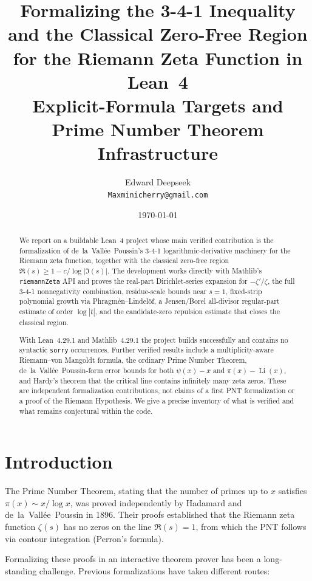 \documentclass[11pt,a4paper]{article}
\title{\bfseries Formalizing the 3-4-1 Inequality and the Classical Zero-Free Region\\
for the Riemann Zeta Function in Lean~4\\
{\large Explicit-Formula Targets and Prime Number Theorem Infrastructure}}
\author{Edward Deepseek\\
  \texttt{Maxminicherry@gmail.com}
}
\date{\today}
\theoremstyle{remark}
\begin{document}
\maketitle

\begin{abstract}
We report on a buildable Lean~4 project whose main verified contribution is
the formalization of de~la~Vall\'ee~Poussin's 3-4-1 logarithmic-derivative
machinery for the Riemann zeta function, together with the classical
zero-free region \(\Re(s)\geq1-c/\log|\Im(s)|\).  The development works directly with Mathlib's
\texttt{riemannZeta} API and proves the real-part Dirichlet-series expansion
for \(-\zeta'/\zeta\), the full 3-4-1 nonnegativity combination, residue-scale
bounds near \(s=1\), fixed-strip polynomial growth via Phragm\'en--Lindel\"of,
a Jensen/Borel all-divisor regular-part estimate of order \(\log|t|\), and the
candidate-zero repulsion estimate that closes the classical region.

With Lean~4.29.1 and Mathlib~4.29.1 the project builds successfully and
contains no syntactic \texttt{sorry} occurrences.  Further verified results
include a multiplicity-aware Riemann--von Mangoldt formula, the ordinary Prime
Number Theorem, de~la~Vall\'ee~Poussin-form error bounds for both \(\psi(x)-x\)
and \(\pi(x)-\operatorname{Li}(x)\), and Hardy's theorem that the critical line
contains infinitely many zeta zeros.  These are independent formalization
contributions, not claims of a first PNT formalization or a proof of the
Riemann Hypothesis.  We give a precise inventory of what is verified and what
remains conjectural within the code.
\end{abstract}

\section{Introduction}

The Prime Number Theorem, stating that the number of primes up to $x$
satisfies $\pi(x) \sim x/\log x$, was proved independently by Hadamard and
de~la~Vall\'ee~Poussin in 1896. Their proofs established that the Riemann
zeta function $\zeta(s)$ has no zeros on the line $\Re(s)=1$, from which
the PNT follows via contour integration (Perron's formula).

Formalizing these proofs in an interactive theorem prover has been a
long-standing challenge. Previous formalizations have taken different routes:
\end{document}
